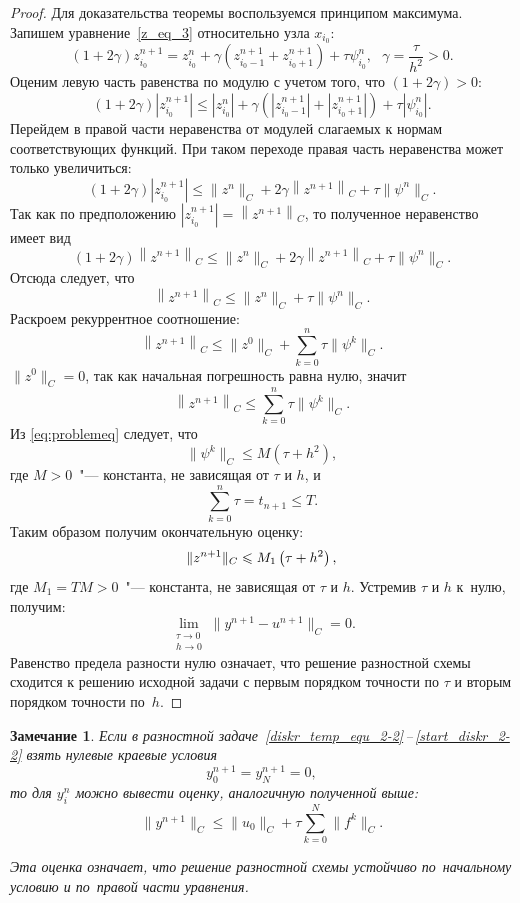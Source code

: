 \documentclass[11pt,a4paper,twoside,listtotoc,bibtotoc]{report}
\numberwithin{equation}{section}
\theoremstyle{definition}
\theoremstyle{plain}
\newtheorem*{note*}{Замечание}
\DeclarePairedDelimiter\norm{\lVert}{\rVert}
\begin{document}
\begin{proof}
Для доказательства теоремы воспользуемся принципом максимума.
Запишем уравнение~\eqref{z_eq_3} относительно
узла $x_{i_0}$:
%
$$
    \left(1 + 2\gamma\right)z_{i_0}^{n+1} = z_{i_0}^n + \gamma\left(z_{i_0-1}^{n+1} +
    z_{i_0+1}^{n+1}\right) + \tau \psi_{i_0}^n, ~~~\gamma = \frac{\tau}{h^2}>0.
$$
%
Оценим левую часть равенства по модулю с учетом того, что $\left(1+2\gamma\right)>0$:
%
$$
    \left(1 + 2\gamma\right)\left|z_{i_0}^{n+1}\right| \leqslant \left|z_{i_0}^n\right| +
    \gamma\left(\left|z_{i_0 - 1}^{n+1}\right| +
    \left|z_{i_0 + 1}^{n+1}\right|\right) + \tau\left|\psi_{i_0}^n\right|.
$$
%
Перейдем в правой части неравенства от модулей слагаемых к нормам соответствующих
функций. При таком переходе правая часть неравенства может только увеличиться:
%
$$
    \left(1 + 2\gamma\right)\left|z_{i_0}^{n+1}\right| \leqslant
    \big\|z^{n}\big\|_C + 2\gamma\left\|z^{n+1}\right\|_C +
    \tau \big\|\psi^n\big\|_C.
$$
%
Так как по предположению $\left|z_{i_0}^{n+1}\right| = \left\|z^{n+1}\right\|_C$,
то полученное неравенство имеет вид
%
$$
    \left(1 + 2\gamma\right)\left\|z^{n+1}\right\|_C \leqslant
    \big\|z^{n}\big\|_C + 2\gamma\left\|z^{n+1}\right\|_C +
    \tau \big\|\psi^n\big\|_C.
$$
%
Отсюда следует, что
%
$$
    \left\|z^{n+1}\right\|_C \leqslant \big\|z^n\big\|_C + \tau \big\|\psi^n\big\|_C.
$$
%
Раскроем рекуррентное соотношение:
%
$$
    \left\|z^{n+1}\right\|_C \leqslant \big\|z^0\big\|_C +
    \sum_{k=0}^{n} \tau\big\|\psi^k\big\|_C.
$$
%
$\big\|z^0\big\|_C = 0$, так как начальная погрешность равна нулю, значит
%
$$
    \left\|z^{n+1}\right\|_C \leqslant \sum_{k=0}^n \tau \big\|\psi^k\big\|_C.
$$
%
Из \eqref{eq:problemeq} следует, что
%
$$
    \big\|\psi^k\big\|_C \leqslant M\left(\tau + h^2\right),
$$
%
где $M>0$~"--- константа, не зависящая от $\tau$ и $h$, и
%
$$
    \sum_{k = 0}^n\tau = t_{n+1} \leqslant T.
$$
%
Таким образом получим окончательную оценку:
%
$$
    \norm{z^{n+1}}_C \leqslant M_1\left(\tau + h^2\right),
$$
%
где $M_1=TM>0$~"--- константа, не зависящая от $\tau$ и $h$.
Устремив $\tau$ и $h$ к~нулю, получим:
%
$$
    \lim_{\substack{\tau \rightarrow 0\\h \rightarrow 0}}\big\|y^{n+1}-u^{n+1}\big\|_C = 0.
$$
%
Равенство предела разности нулю означает, что решение разностной схемы
сходится к решению исходной задачи с первым
порядком точности по $\tau$ и вторым порядком точности по~$h$.
%
\end{proof}
%
%
\begin{note*}
%
Если в разностной задаче~\eqref{diskr_temp_equ_2-2}\,--\,\eqref{start_diskr_2-2}
взять нулевые краевые условия
%
$$
    y_0^{n+1} = y_N^{n+1} = 0,
$$
%
то для $y_i^n$ можно вывести оценку, аналогичную полученной выше:
%
$$
    \big\|y^{n+1}\big\|_C \leqslant \big\|u_0\big\|_C +
    \tau \sum_{k=0}^N \big\|f^k\big\|_C.
$$
%

Эта оценка означает, что решение разностной схемы устойчиво по~начальному
условию и по~правой части уравнения.
%
\end{note*}
%
\end{document}
